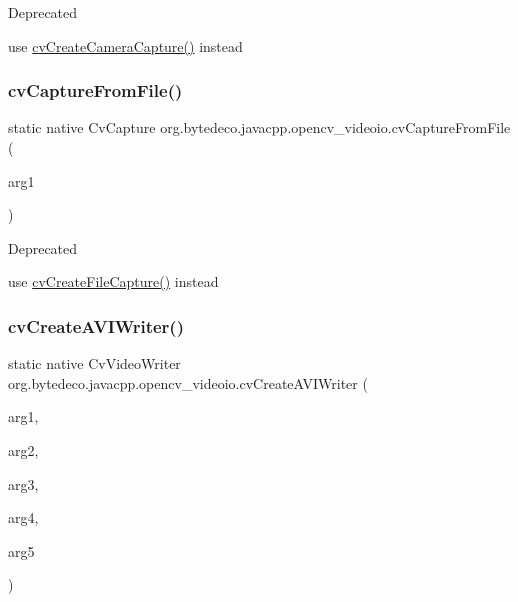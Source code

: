 \begin{DoxyRefDesc}{Deprecated}
\item[\hyperlink{deprecated__deprecated000001}{Deprecated}]use \hyperlink{group__videoio__c_ga43844b7ee876e73697163ae51ec617db}{cv\+Create\+Camera\+Capture()} instead \end{DoxyRefDesc}
\mbox{\label{group__videoio__c_ga5fccc51ced33519e61c5687ca7b17fdb}} 
\subsubsection{\texorpdfstring{cv\+Capture\+From\+File()}{cvCaptureFromFile()}}
{\footnotesize\ttfamily static native Cv\+Capture org.\+bytedeco.\+javacpp.\+opencv\+\_\+videoio.\+cv\+Capture\+From\+File (\begin{DoxyParamCaption}\item[{@Cast(\char`\"{}const char$\ast$\char`\"{}) Byte\+Pointer}]{arg1 }\end{DoxyParamCaption})\hspace{0.3cm}{\ttfamily [static]}}

\begin{DoxyRefDesc}{Deprecated}
\item[\hyperlink{deprecated__deprecated000002}{Deprecated}]use \hyperlink{group__videoio__c_gaf71dcb88fc0c7476076b298ed762ddca}{cv\+Create\+File\+Capture()} instead \end{DoxyRefDesc}
\mbox{\label{group__videoio__c_ga7ac706f58e712a321ff4ed14d9c98dfc}} 
\subsubsection{\texorpdfstring{cv\+Create\+A\+V\+I\+Writer()}{cvCreateAVIWriter()}}
{\footnotesize\ttfamily static native Cv\+Video\+Writer org.\+bytedeco.\+javacpp.\+opencv\+\_\+videoio.\+cv\+Create\+A\+V\+I\+Writer (\begin{DoxyParamCaption}\item[{@Cast(\char`\"{}const char$\ast$\char`\"{}) Byte\+Pointer}]{arg1,  }\item[{int}]{arg2,  }\item[{double}]{arg3,  }\item[{@By\+Val Cv\+Size}]{arg4,  }\item[{int}]{arg5 }\end{DoxyParamCaption})\hspace{0.3cm}{\ttfamily [static]}}

